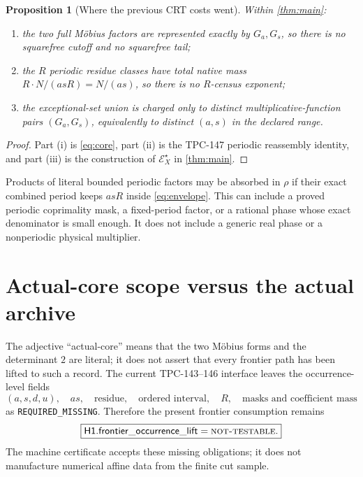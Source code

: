 \documentclass[11pt]{article}
\newtheorem{proposition}[theorem]{Proposition}
\theoremstyle{definition}
\theoremstyle{remark}
\newcommand{\NT}{\textnormal{\textsc{not-testable}}}
\begin{document}
\begin{proposition}[Where the previous CRT costs went]
\label{prop:costs}
Within \cref{thm:main}:
\begin{enumerate}[label=(\roman*),leftmargin=2.2em]
\item the two full M\"obius factors are represented exactly by
  \(G_a,G_s\), so there is no squarefree cutoff and no squarefree
  tail;
\item the \(R\) periodic residue classes have total native mass
  \(R\cdot N/(asR)=N/(as)\), so there is no \(R\)-census exponent;
\item the exceptional-set union is charged only to distinct
  multiplicative-function pairs \((G_a,G_s)\), equivalently to
  distinct \((a,s)\) in the declared range.
\end{enumerate}
\end{proposition}

\begin{proof}
Part (i) is \eqref{eq:core}, part (ii) is the TPC-147 periodic
reassembly identity, and part (iii) is the construction of
\(\mathcal E_X^\star\) in \cref{thm:main}.
\end{proof}

Products of literal bounded periodic factors may be absorbed in
\(\rho\) if their exact combined period keeps \(asR\) inside
\eqref{eq:envelope}.  This can include a proved periodic coprimality
mask, a fixed-period factor, or a rational phase whose exact
denominator is small enough.  It does not include a generic real
phase or a nonperiodic physical multiplier.

\section{Actual-core scope versus the actual archive}

The adjective ``actual-core'' means that the two M\"obius forms and
the determinant \(2\) are literal; it does not assert that every
frontier path has been lifted to such a record.  The current
TPC-143--146 interface leaves the occurrence-level fields
\[
 (a,s,d,u),\quad as,\quad\text{residue},\quad\text{ordered interval},
 \quad R,\quad\text{masks and coefficient mass}
\]
as \texttt{REQUIRED\_MISSING}.  Therefore the present frontier
consumption remains
\[
 \boxed{\mathsf{H1.frontier\_occurrence\_lift}=\NT.}
\]
The machine certificate accepts these missing obligations; it does
not manufacture numerical affine data from the finite cut sample.
\end{document}
